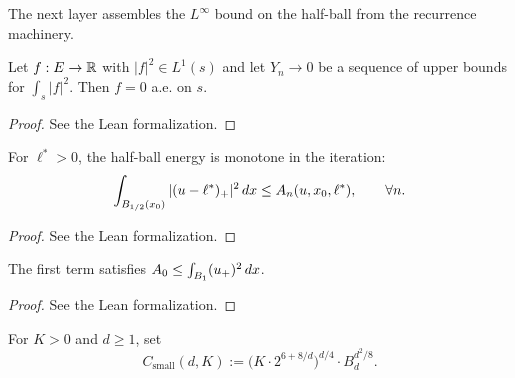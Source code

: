 The next layer assembles the $L^\infty$ bound on the half-ball from
the recurrence machinery.

\begin{lemma}
\label{lem:ae_eq_zero_of_forall_setIntegral_sq_le_of_tendsto_zero}
\leanok
Let $f : E \to \mathbb{R}$ with $|f|^2 \in L^1(s)$ and let $Y_n \to 0$ be a
sequence of upper bounds for $\int_s |f|^2$. Then $f = 0$ a.e. on
$s$.
\end{lemma}

\begin{proof}
\leanok
See the Lean formalization.
\end{proof}

\begin{lemma}
\label{lem:integral_sq_halfBall_le_deGiorgiEnergySeq}
\leanok
{}
For $\ell^* > 0$, the half-ball energy is monotone in the iteration:
\begin{equation*}
  \int_{B_{1/2}(x_0)} |(u-\ell^*)_+|^2 \, dx
   \le A_n(u, x_0, \ell^*),
\qquad \forall n.
\end{equation*}
\end{lemma}

\begin{proof}
\leanok
{}
See the Lean formalization.
\end{proof}

\begin{lemma}
\label{lem:deGiorgiEnergySeq_zero_le_integral_sq_posPartZero_on_unitBal}
\leanok
{}
The first term satisfies
$A_0 \le \int_{B_{1}} (u_+)^2 \, dx$.
\end{lemma}

\begin{proof}
\leanok
{}
See the Lean formalization.
\end{proof}

\begin{definition}
\label{def:C_DeGiorgiSmallness}
\leanok
{}
For $K > 0$ and $d \ge 1$, set
\begin{equation*}
  C_{\mathrm{small}}(d, K) :=
   \bigl(K \cdot 2^{6 + 8/d}\bigr)^{d/4}
   \cdot B_d^{d^2/8}.
\end{equation*}
\end{definition}

